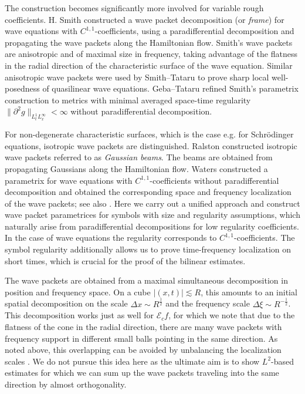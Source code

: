 \documentclass{amsart}
\theoremstyle{definition}
\begin{document}
The construction becomes significantly more involved for variable rough coefficients. H. Smith \cite{Smith1998} constructed a wave packet decomposition (or \emph{frame}) for wave equations with $C^{1,1}$-coefficients, using a paradifferential decomposition and propagating the wave packets along the Hamiltonian flow. Smith's wave packets are anisotropic and of maximal size in frequency, taking advantage of the flatness in the radial direction of the characteristic surface of the wave equation. Similar anisotropic wave packets were used by Smith--Tataru \cite{SmithTataru2005} to prove sharp local well-posedness of quasilinear wave equations. Geba--Tataru \cite{GebaTataru2007} refined Smith's parametrix construction to metrics with minimal averaged space-time regularity $\| \partial^2 g \|_{L_t^1 L_{x}^{\infty}} < \infty$ without paradifferential decomposition. 

\smallskip

For non-degenerate characteristic surfaces, which is the case e.g. for Schr\"odinger equations, isotropic wave packets are distinguished. 
Ralston \cite{Ralston1982} constructed isotro\-pic wave packets referred to as \emph{Gaussian beams}. The beams are obtained from propagating Gaussians along the Hamiltonian flow. Waters \cite{Waters2011} constructed a parametrix for wave equations with $C^{1,1}$-coefficients without paradifferential decomposition and obtained the corresponding space and frequency localization of the wave packets; see also \cite{Waters2019}.
Here we carry out a unified approach and construct wave packet parametrices for symbols with size and regularity assumptions, which naturally arise from paradifferential decompositions for low regularity coefficients. In the case of wave equations the regularity corresponds to $C^{1,1}$-coefficients. The symbol regularity additionally allows us to prove time-frequency localization on short times, which is crucial for the proof of the bilinear estimates.

\smallskip

The wave packets are obtained from a maximal simultaneous decomposition in position and frequency space. On a cube $|(x,t)| \lesssim R$, this amounts to an initial spatial decomposition on the scale $\Delta x \sim R^{\frac{1}{2}}$ and the frequency scale $\Delta \xi \sim R^{-\frac{1}{2}}$. This decomposition works just as well for $\mathcal{E}_{c} f$, for which we note that due to the flatness of the cone in the radial direction, there are many wave packets with frequency support in different small balls pointing in the same direction. As noted above, this overlapping can be avoided by 
unbalancing the localization scales \cite{Smith1998,Wolff01,SmithTataru2005,GebaTataru2007}. We do not pursue this idea here as the ultimate aim is to show $L^2$-based estimates for which we can sum up the wave packets traveling into the same direction by almost orthogonality.
\end{document}
